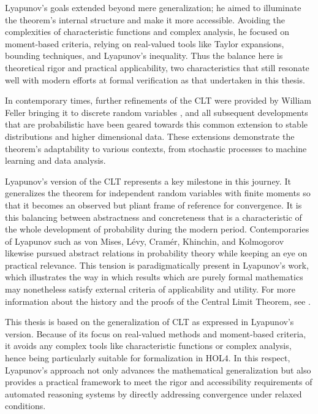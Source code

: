 Lyapunov’s goals extended beyond mere generalization; he aimed to illuminate the theorem’s internal structure and make it more accessible. Avoiding the complexities of characteristic functions and complex analysis, he focused on moment-based criteria, relying on real-valued tools like Taylor expansions, bounding techniques, and Lyapunov's inequality. Thus the balance here is theoretical rigor and practical applicability, two characteristics that still resonate well with modern efforts at formal verification as that undertaken in this thesis.

In contemporary times, further refinements of the CLT were provided by William Feller bringing it to discrete random variables \cite{feller1945}, and all subsequent developments that are probabilistic have been geared towards this common extension to stable distributions and higher dimensional data. These extensions demonstrate the theorem’s adaptability to various contexts, from stochastic processes to machine learning and data analysis.

Lyapunov’s version of the CLT represents a key milestone in this journey. It generalizes the theorem for independent random variables with finite moments so that it becomes an observed but pliant frame of reference for convergence. It is this balancing between abstractness and concreteness that is a characteristic of the whole development of probability during the modern period. Contemporaries of Lyapunov such as von Mises, Lévy, Cramér, Khinchin, and Kolmogorov likewise pursued abstract relations in probability theory while keeping an eye on practical relevance. This tension is paradigmatically present in Lyapunov's work, which illustrates the way in which results which are purely formal mathematics may nonetheless satisfy external criteria of applicability and utility. For more information about the history and the proofs of the Central Limit Theorem, see \cite{fischer2011history, adams2009life}.

This thesis is based on the generalization of CLT as expressed in Lyapunov's version. Because of its focus on real-valued methods and moment-based criteria, it avoids any complex tools like characteristic functions or complex analysis, hence being particularly suitable for formalization in HOL4. In this respect, Lyapunov's approach not only advances the mathematical generalization but also provides a practical framework to meet the rigor and accessibility requirements of automated reasoning systems by directly addressing convergence under relaxed conditions.

